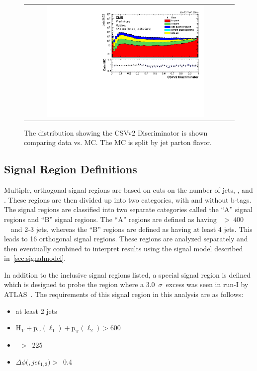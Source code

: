 \begin{figure}[!ht]
  \begin{center}
    \begin{tabular}{cc}
      \includegraphics[width=0.8\textwidth]{evtsel/figs/ak4Inclusive_CSVIVF_Log.pdf}
    \end{tabular}
    \caption{
      The distribution showing the CSVv2 Discriminator is shown comparing data vs. MC.
      The MC is split by jet parton flavor.
      \label{fig:csv}
    }
  \end{center}
\end{figure}

\subsection{Signal Region Definitions}
\label{sec:SRs}
Multiple, orthogonal signal regions are based on cuts on the number of jets, \Ht, and \MET.
These regions are then divided up into two categories, with and without b-tags.
The signal regions are classified into two separate categories called the ``A'' signal regions and ``B'' signal regions.
The ``A'' regions are defined as having \Ht\ $>~400$~\gev\ and 2-3 jets,
whereas the ``B'' regions are defined as having at least 4 jets. 
This leads to 16 orthogonal signal regions.
These regions are analyzed separately and then eventually combined to interpret results using the signal model described in~\ref{sec:signalmodel}.

In addition to the inclusive signal regions listed, a special signal region is defined which is designed to probe the region where a 3.0~$\sigma$~excess was seen in run-I by ATLAS~\cite{ATLASZPAPER}.
The requirements of this signal region in this analysis are as follows:

\begin{itemize}
\item at least 2 jets
\item $\mathrm{H_{T}+p_{T}(\ell_1)+p_{T}(\ell_2) > }$600 \gev
\item \MET~$>$~225 \gev
\item $\Delta\phi($\MET$,jet_{1,2})>$~0.4
\end{itemize}

